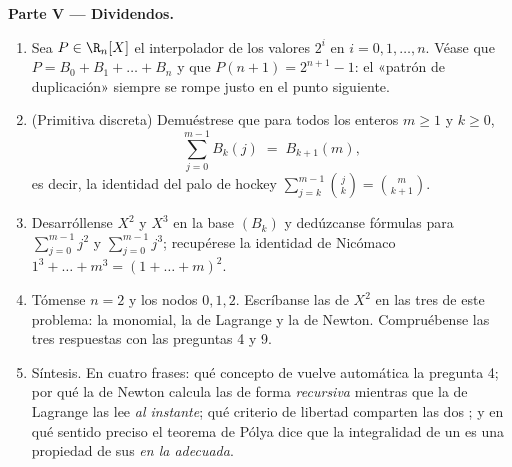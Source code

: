 \begin{problem}
\medskip
\noindent\textbf{Parte V --- Dividendos.}
\begin{enumerate}[resume]
  \item Sea $P \in \R_n[X]$ el interpolador de los valores $2^i$ en
        $i = 0, 1, \dots, n$. Véase que $P = B_0 + B_1 + \dots + B_n$
        y que $P(n + 1) = 2^{n+1} - 1$: el «patrón de duplicación»
        siempre se rompe justo en el punto siguiente.
  \item (Primitiva discreta) Demuéstrese que para todos los enteros
        $m \geq 1$ y $k \geq 0$,
        \[
        \sum_{j=0}^{m-1} B_k(j) \;=\; B_{k+1}(m),
        \]
        es decir, la identidad del palo de hockey
        $\sum_{j=k}^{m-1} \binom{j}{k} = \binom{m}{k+1}$.
  \item Desarróllense $X^2$ y $X^3$ en la base $(B_k)$ y dedúzcanse
        fórmulas  para $\sum_{j=0}^{m-1} j^2$ y
        $\sum_{j=0}^{m-1} j^3$; recupérese la identidad de Nicómaco
        $1^3 + \dots + m^3 = (1 + \dots + m)^2$.
  \item Tómense $n = 2$ y los nodos $0, 1, 2$. Escríbanse las
         de $X^2$ en las tres  de este problema: la
         monomial, la  de Lagrange y la  de Newton.
        Compruébense las tres respuestas con las preguntas 4 y 9.
  \item Síntesis. En cuatro frases: qué concepto de  vuelve automática la pregunta 4; por qué la 
        de Newton calcula las  de forma
        \emph{recursiva} mientras que la  de Lagrange las lee
        \emph{al instante}; qué criterio de libertad comparten las
        dos ; y en qué sentido preciso el teorema de Pólya dice
        que la integralidad de un  es una propiedad de sus
         \emph{en la  adecuada}.
\end{enumerate}
\end{problem}
